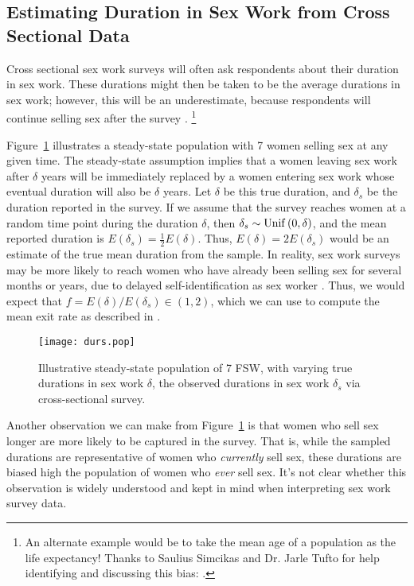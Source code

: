 \subsection{Estimating Duration in Sex Work from Cross Sectional Data}\label{app.math.dur.xs}
Cross sectional sex work surveys will often ask respondents about their duration in sex work.
These durations might then be taken to be the average durations in sex work;
however, this will be an underestimate,
because respondents will continue selling sex after the survey \cite{Fazito2012}.%
\footnote{An alternate example would be
  to take the mean age of a population as the life expectancy!
  Thanks to Saulius Simcikas and Dr. Jarle Tufto
  for help identifying and discussing this bias:
  .}
\par
Figure~\ref{fig:durs.pop} illustrates a steady-state population
with 7 women selling sex at any given time.
The steady-state assumption implies that a women leaving sex work after $\delta$ years
will be immediately replaced by a women entering sex work
whose eventual duration will also be $\delta$ years.
Let $\delta$ be this true duration, and $\delta_s$ be the duration reported in the survey.
If we assume that the survey reaches women at a random time point during the duration $\delta$,
then $\delta_s \sim \operatorname{Unif}\,(0,\delta)$,
and the mean reported duration is $E(\delta_s) = \frac{1}{2}E(\delta)$.
Thus, $E(\delta) = 2 E(\delta_s)$ would be an estimate of the true mean duration from the sample.
In reality, sex work surveys may be more likely to reach
women who have already been selling sex for several months or years,
due to delayed self-identification as sex worker \cite{Cheuk2020}.
Thus, we would expect that $f = E(\delta) / E(\delta_s) \in (1,2)$,
which we can use to compute the mean exit rate as described in .
\begin{figure}[h]
  \centering
  \texttt{[image: durs.pop]}
  \caption{Illustrative steady-state population of 7 FSW,
    with varying true durations in sex work $\delta$,
    \vs the observed durations in sex work $\delta_s$ via cross-sectional survey.}
  \label{fig:durs.pop}
\end{figure}
\par
Another observation we can make from Figure~\ref{fig:durs.pop} is that
women who sell sex longer are more likely to be captured in the survey.
That is, while the sampled durations are representative of women who \emph{currently} sell sex,
these durations are biased high \vs the population of women who \emph{ever} sell sex.
It's not clear whether this observation is widely understood
and kept in mind when interpreting sex work survey data.
